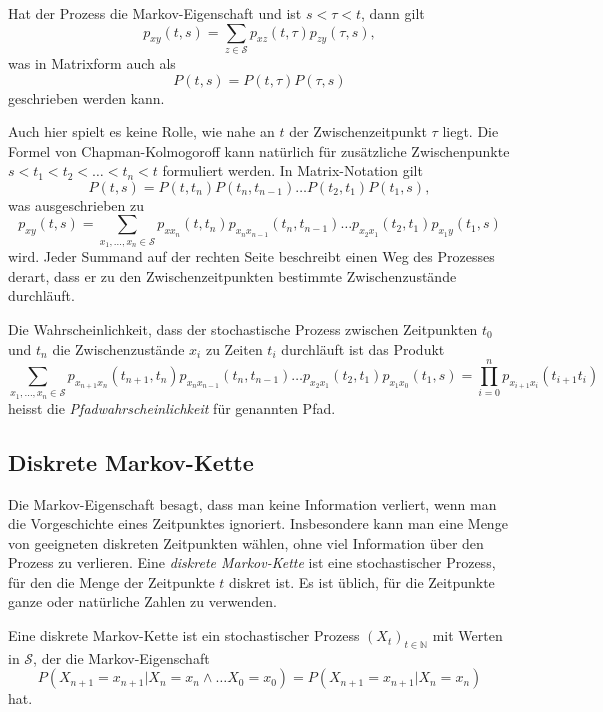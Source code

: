 \begin{satz}
Hat der Prozess die Markov-Eigenschaft und ist $s<\tau <t$, dann gilt
\[
p_{xy}(t,s) = \sum_{z\in\mathcal{S}} p_{xz}(t,\tau) p_{zy}(\tau,s),
\]
was in Matrixform auch als
\[
P(t,s) = P(t,\tau)P(\tau,s)
\]
geschrieben werden kann.
\end{satz}

Auch hier spielt es keine Rolle, wie nahe an $t$ der Zwischenzeitpunkt
$\tau$ liegt.
Die Formel von Chapman-Kolmogoroff kann natürlich für zusätzliche
Zwischenpunkte $s<t_1<t_2<\dots< t_n< t$ formuliert werden.
In Matrix-Notation gilt
\[
P(t,s) = P(t,t_n)P(t_n,t_{n-1})\dots P(t_2,t_1)P(t_1,s),
\]
was ausgeschrieben zu
\[
p_{xy}(t,s)
=
\sum_{x_1,\dots,x_n\in\mathcal{S}}
p_{xx_n}(t,t_n)
p_{x_nx_{n-1}}(t_n,t_{n-1})
\dots
p_{x_2x_1}(t_2,t_1)
p_{x_1y}(t_1,s)
\]
wird.
Jeder Summand auf der rechten Seite beschreibt einen Weg des Prozesses
derart, dass er zu den Zwischenzeitpunkten bestimmte 
Zwischenzustände durchläuft.

\begin{definition}
Die Wahrscheinlichkeit, dass der stochastische Prozess zwischen Zeitpunkten
$t_0$ und $t_n$ die Zwischenzustände $x_i$ zu Zeiten $t_i$ durchläuft ist
das Produkt
\[
\sum_{x_1,\dots,x_n\in\mathcal{S}}
p_{x_{n+1}x_n}(t_{n+1},t_n)
p_{x_nx_{n-1}}(t_n,t_{n-1})
\dots
p_{x_2x_1}(t_2,t_1)
p_{x_1x_0}(t_1,s)
=
\prod_{i=0}^{n}
p_{x_{i+1}x_i}(t_{i+1}t_i)
\]
heisst die {\em Pfadwahrscheinlichkeit} für genannten Pfad.
%
\end{definition}

%
%
\subsection{Diskrete Markov-Kette}
Die Markov-Eigenschaft besagt, dass man keine Information verliert,
wenn man die Vorgeschichte eines Zeitpunktes ignoriert.
Insbesondere kann man eine Menge von geeigneten diskreten
Zeitpunkten wählen, ohne viel Information über den Prozess zu
verlieren.
Eine {\em diskrete Markov-Kette} ist eine stochastischer Prozess,
für den die Menge der Zeitpunkte $t$ diskret ist.
Es ist üblich, für die Zeitpunkte ganze oder natürliche Zahlen zu
verwenden.

\begin{definition}
Eine diskrete Markov-Kette ist ein stochastischer Prozess
$(X_t)_{t\in\mathbb{N}}$ mit Werten in $\mathcal{S}$, der die
Markov-Eigenschaft
\[
P(X_{n+1}=x_{n+1}|X_n=x_n\wedge\dots X_0=x_0)
=
P(X_{n+1}=x_{n+1}|X_n=x_n)
\]
hat.
\end{definition}

